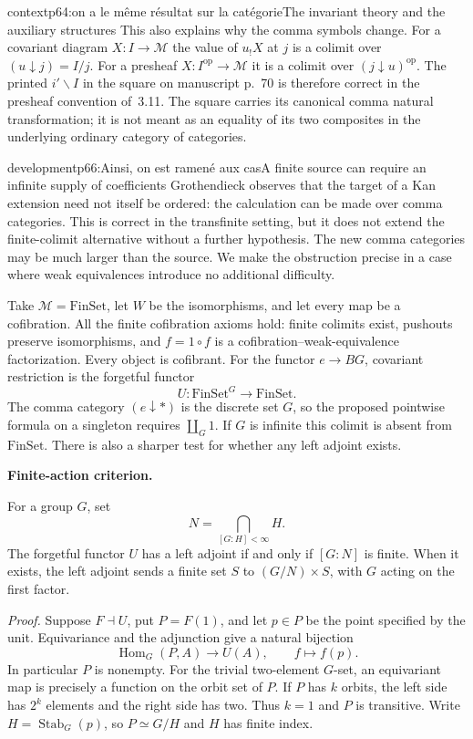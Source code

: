 \begin{dcomment}{context}{p64:on a le même résultat sur la catégorie}{The invariant theory and the auxiliary structures}
This also explains why the comma symbols change. For a covariant diagram $X:I\to\mathcal M$ the value of $u_!X$ at $j$ is a colimit over $(u\downarrow j)=I/j$. For a presheaf $X:I^{\mathrm{op}}\to\mathcal M$ it is a colimit over $(j\downarrow u)^{\mathrm{op}}$. The printed $i'\backslash I$ in the square on manuscript p.~70 is therefore correct in the presheaf convention of~3.11. The square carries its canonical comma natural transformation; it is not meant as an equality of its two composites in the underlying ordinary category of categories.
\end{dcomment}

\begin{dcomment}{development}{p66:Ainsi, on est ramené aux cas}{A finite source can require an infinite supply of coefficients}
Grothendieck observes that the target of a Kan extension need not itself be ordered: the calculation can be made over comma categories. This is correct in the transfinite setting, but it does not extend the finite-colimit alternative without a further hypothesis. The new comma categories may be much larger than the source. We make the obstruction precise in a case where weak equivalences introduce no additional difficulty.

Take $\mathcal M=\mathrm{FinSet}$, let $W$ be the isomorphisms, and let every map be a cofibration. All the finite cofibration axioms hold: finite colimits exist, pushouts preserve isomorphisms, and $f=1\circ f$ is a cofibration--weak-equivalence factorization. Every object is cofibrant. For the functor $e\to BG$, covariant restriction is the forgetful functor
\[
 U:\mathrm{FinSet}^{G}\longrightarrow\mathrm{FinSet}.
\]
The comma category $(e\downarrow *)$ is the discrete set $G$, so the proposed pointwise formula on a singleton requires $\coprod_G1$. If $G$ is infinite this colimit is absent from $\mathrm{FinSet}$. There is also a sharper test for whether any left adjoint exists.

\textbf{Finite-action criterion.}\ours\par
For a group $G$, set
\[
 N=\bigcap_{[G:H]<\infty}H.
\]
The forgetful functor $U$ has a left adjoint if and only if $[G:N]$ is finite. When it exists, the left adjoint sends a finite set $S$ to $(G/N)\times S$, with $G$ acting on the first factor.

\emph{Proof.}
Suppose $F\dashv U$, put $P=F(1)$, and let $p\in P$ be the point specified by the unit. Equivariance and the adjunction give a natural bijection
\[
 \operatorname{Hom}_G(P,A)\longrightarrow U(A),\qquad
 f\longmapsto f(p).
\]
In particular $P$ is nonempty. For the trivial two-element $G$-set, an equivariant map is precisely a function on the orbit set of $P$. If $P$ has $k$ orbits, the left side has $2^k$ elements and the right side has two. Thus $k=1$ and $P$ is transitive. Write $H=\operatorname{Stab}_G(p)$, so $P\simeq G/H$ and $H$ has finite index.


\end{dcomment}
